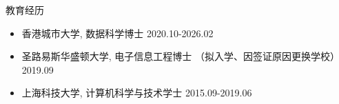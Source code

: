 \documentclass{resume} %
\begin{document}




\begin{rSection}{教育经历}

\begin{itemize}
    \item {香港城市大学}, 数据科学博士 \hfill {2020.10-2026.02}
    \item {圣路易斯华盛顿大学}, 电子信息工程博士 （拟入学、因签证原因更换学校） \hfill {2019.09}
    \item {上海科技大学}, 计算机科学与技术学士 \hfill {2015.09-2019.06} 
\end{itemize}

\end{rSection}


\def\FormatName#1{%
    \def\myname{Junyan Su}%
    \edef\name{#1}%
    \ifx\name\myname
      \underline{#1}%
    \else
       #1%
    \fi
}
\end{document}
